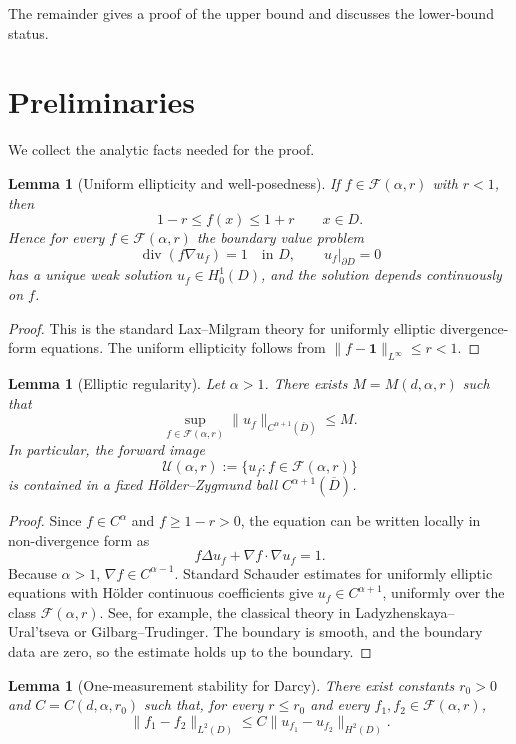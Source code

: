 \documentclass[11pt]{article}
\theoremstyle{plain}
\newtheorem{lemma}[theorem]{Lemma}
\theoremstyle{definition}
\newcommand{\1}{\mathbf 1}
\newcommand{\F}{\mathcal F}
\DeclareMathOperator{\divg}{div}
\begin{document}
The remainder gives a proof of the upper bound and discusses the lower-bound status.

\section{Preliminaries}

We collect the analytic facts needed for the proof.

\begin{lemma}[Uniform ellipticity and well-posedness]
\label{lem:wellposed}
If \(f\in \F(\alpha,r)\) with \(r<1\), then
\[
1-r \le f(x)\le 1+r\qquad x\in D.
\]
Hence for every \(f\in\F(\alpha,r)\) the boundary value problem
\[
\divg(f\nabla u_f)=1\quad\text{in }D,\qquad u_f|_{\partial D}=0
\]
has a unique weak solution \(u_f\in H^1_0(D)\), and the solution depends continuously on \(f\).
\end{lemma}

\begin{proof}
This is the standard Lax--Milgram theory for uniformly elliptic divergence-form equations. The uniform ellipticity follows from \(\|f-\1\|_{L^\infty}\le r<1\).
\end{proof}

\begin{lemma}[Elliptic regularity]
\label{lem:reg}
Let \(\alpha>1\). There exists \(M=M(d,\alpha,r)\) such that
\[
\sup_{f\in\F(\alpha,r)}\|u_f\|_{C^{\alpha+1}(\overline D)}
\le M.
\]
In particular, the forward image
\[
\mathcal U(\alpha,r):=\{u_f:f\in\F(\alpha,r)\}
\]
is contained in a fixed Hölder--Zygmund ball \(C^{\alpha+1}(\overline D)\).
\end{lemma}

\begin{proof}
Since \(f\in C^\alpha\) and \(f\ge 1-r>0\), the equation can be written locally in non-divergence form as
\[
f\Delta u_f + \nabla f\cdot \nabla u_f = 1.
\]
Because \(\alpha>1\), \(\nabla f\in C^{\alpha-1}\). Standard Schauder estimates for uniformly elliptic equations with Hölder continuous coefficients give \(u_f\in C^{\alpha+1}\), uniformly over the class \(\F(\alpha,r)\). See, for example, the classical theory in Ladyzhenskaya--Ural'tseva or Gilbarg--Trudinger. The boundary is smooth, and the boundary data are zero, so the estimate holds up to the boundary.
\end{proof}

\begin{lemma}[One-measurement stability for Darcy]
\label{lem:stability}
There exist constants \(r_0>0\) and \(C=C(d,\alpha,r_0)\) such that, for every \(r\le r_0\) and every \(f_1,f_2\in\F(\alpha,r)\),
\[
\|f_1-f_2\|_{L^2(D)}
\le
C\|u_{f_1}-u_{f_2}\|_{H^2(D)}.
\]
\end{lemma}
\end{document}
